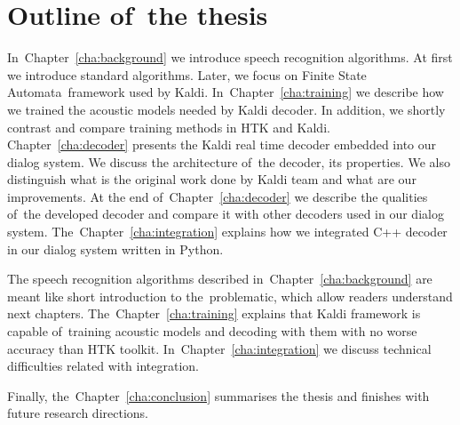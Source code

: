 

\section{Outline of~the thesis} 
\label{sec:outline_of_the_thesis}
In~Chapter~\ref{cha:background} we introduce speech recognition algorithms. At first we introduce standard algorithms. Later, we focus on Finite State Automata~framework used by Kaldi. In~Chapter~\ref{cha:training} we describe how we trained the acoustic models needed by Kaldi decoder. In addition, we shortly contrast and compare training methods in \ac{HTK} and Kaldi. Chapter~\ref{cha:decoder} presents the Kaldi real time decoder embedded into our dialog system. We discuss the architecture of~the decoder, its properties. We also distinguish what is the original work done by Kaldi team and what are our improvements. At the end of~Chapter~\ref{cha:decoder} we describe the qualities of~the developed decoder and compare it with other decoders used in our dialog system.
The~Chapter~\ref{cha:integration} explains how we integrated C++ decoder in our dialog system written in Python.
    
The speech recognition algorithms described in~Chapter~\ref{cha:background} are meant like short introduction to the~problematic, which allow readers understand next chapters. The~Chapter~\ref{cha:training} explains that Kaldi framework is capable of~training acoustic models and decoding with them with no worse accuracy than \ac{HTK} toolkit. In~Chapter~\ref{cha:integration} we discuss technical difficulties related with integration. 

Finally, the~Chapter~\ref{cha:conclusion} summarises the thesis and finishes with future research directions.

